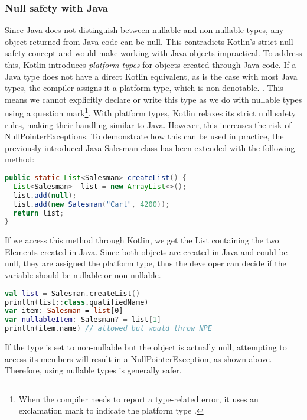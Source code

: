 \documentclass[a4paper,11pt]{article}
\begin{document}
\subsubsection{Null safety with Java}
Since Java does not distinguish between nullable and non-nullable types, any object returned from Java code can be null. This contradicts Kotlin's strict null safety concept and would make working with Java objects impractical.
To address this, Kotlin introduces \textit{platform types} for objects created through Java code. If a Java type does not have a direct Kotlin equivalent, as is the case with most Java types, the compiler assigns it a platform type, which is non-denotable. \cite{interop-null-safety}. This means we cannot explicitly declare or write this type as we do with nullable types using a question mark\footnote{When the compiler needs to report a type-related error, it uses an exclamation mark to indicate the platform type \cite{interop-platform-notation}.}. With platform types, Kotlin relaxes its strict null safety rules, making their handling similar to Java. However, this increases the risk of NullPointerExceptions.
To demonstrate how this can be used in practice, the previously introduced Java Salesman class has been extended with the following method:
\begin{lstlisting}[language=Java]
public static List<Salesman> createList() {
  List<Salesman>  list = new ArrayList<>();
  list.add(null);
  list.add(new Salesman("Carl", 4200));
  return list;
}
\end{lstlisting}
If we access this method through Kotlin, we get the List containing the two Elements created in Java. Since both objects are created in Java and could be null, they are assigned the platform type, thus the developer can decide if the variable should be nullable or non-nullable.
\begin{lstlisting}[language=Kotlin]  
val list = Salesman.createList()
println(list::class.qualifiedName)
var item: Salesman = list[0]
var nullableItem: Salesman? = list[1]
println(item.name) // allowed but would throw NPE
\end{lstlisting}
If the type is set to non-nullable but the object is actually null, attempting to access its members will result in a NullPointerException, as shown above. Therefore, using nullable types is generally safer.
\end{document}
